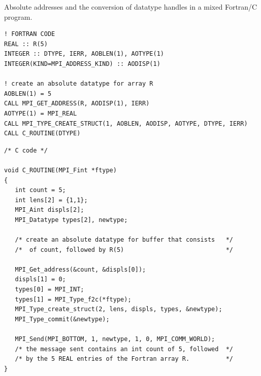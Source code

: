 \begin{example}
Absolute addresses and the conversion of datatype handles in a mixed Fortran/C program.
%
\label{sec:misc-interlangcom}
\begin{lstlisting}[language={[MPI]Fortran}]
! FORTRAN CODE
REAL :: R(5)
INTEGER :: DTYPE, IERR, AOBLEN(1), AOTYPE(1)
INTEGER(KIND=MPI_ADDRESS_KIND) :: AODISP(1)

! create an absolute datatype for array R
AOBLEN(1) = 5
CALL MPI_GET_ADDRESS(R, AODISP(1), IERR)
AOTYPE(1) = MPI_REAL
CALL MPI_TYPE_CREATE_STRUCT(1, AOBLEN, AODISP, AOTYPE, DTYPE, IERR)
CALL C_ROUTINE(DTYPE)
\end{lstlisting}

\begin{lstlisting}[language={[MPI]C}]
/* C code */

void C_ROUTINE(MPI_Fint *ftype)
{
   int count = 5;
   int lens[2] = {1,1};
   MPI_Aint displs[2];
   MPI_Datatype types[2], newtype;

   /* create an absolute datatype for buffer that consists   */
   /*  of count, followed by R(5)                            */

   MPI_Get_address(&count, &displs[0]);
   displs[1] = 0;
   types[0] = MPI_INT;
   types[1] = MPI_Type_f2c(*ftype);
   MPI_Type_create_struct(2, lens, displs, types, &newtype);
   MPI_Type_commit(&newtype);

   MPI_Send(MPI_BOTTOM, 1, newtype, 1, 0, MPI_COMM_WORLD);
   /* the message sent contains an int count of 5, followed  */
   /* by the 5 REAL entries of the Fortran array R.          */
}
\end{lstlisting}
\end{example}

